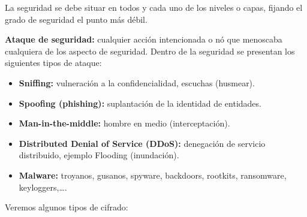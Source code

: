 \documentclass[a4paper,11pt]{article}
\begin{document}
La seguridad se debe situar en todos y cada uno de los niveles o capas, fijando el grado de seguridad el punto más débil. 

\textbf{Ataque de seguridad:} cualquier acción intencionada o nó que menoscaba cualquiera de los aspecto de seguridad. Dentro de la seguridad se presentan los siguientes tipos de ataque:

\begin{itemize}
\item \textbf{Sniffing:} vulneración a la confidencialidad, escuchas (husmear).

\item \textbf{Spoofing (phishing):} suplantación de la identidad de entidades.

\item \textbf{Man-in-the-middle:} hombre en medio (interceptación).

\item \textbf{Distributed Denial of Service (DDoS):} denegación de servicio distribuido, ejemplo Flooding (inundación).

\item \textbf{Malware:} troyanos, gusanos, spyware, backdoors, rootkits, ransomware, keyloggers,\ldots.
\end{itemize}

Veremos algunos tipos de cifrado:
\end{document}
